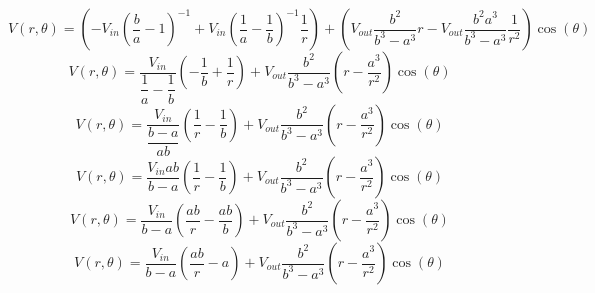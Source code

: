\documentclass[11pt]{article}
\numberwithin{equation}{section}
\begin{document}
$$V(r,\theta) = \left(-V_{in}\left(\frac{b}{a}-1\right)^{-1}+V_{in}\left(\frac{1}{a}-\frac{1}{b}\right)^{-1}\frac{1}{r}\right) + \left(V_{out}\frac{b^{2}}{b^3-a^3}r-V_{out}\frac{b^{2}a^3}{b^3-a^3}\frac{1}{r^{2}}\right)\cos(\theta)$$
$$V(r,\theta) = \frac{V_{in}}{\dfrac{1}{a}-\dfrac{1}{b}}\left(-\frac{1}{b}+\frac{1}{r}\right) + V_{out}\frac{b^{2}}{b^3-a^3}\left(r-\frac{a^3}{r^{2}}\right)\cos(\theta)$$
$$V(r,\theta) = \frac{V_{in}}{\dfrac{b-a}{ab}}\left(\frac{1}{r}-\frac{1}{b}\right) + V_{out}\frac{b^{2}}{b^3-a^3}\left(r-\frac{a^3}{r^{2}}\right)\cos(\theta)$$
$$V(r,\theta) = \frac{V_{in}ab}{b-a}\left(\frac{1}{r}-\frac{1}{b}\right) + V_{out}\frac{b^{2}}{b^3-a^3}\left(r-\frac{a^3}{r^{2}}\right)\cos(\theta)$$
$$V(r,\theta) = \frac{V_{in}}{b-a}\left(\frac{ab}{r}-\frac{ab}{b}\right) + V_{out}\frac{b^{2}}{b^3-a^3}\left(r-\frac{a^3}{r^{2}}\right)\cos(\theta)$$
$$V(r,\theta) = \frac{V_{in}}{b-a}\left(\frac{ab}{r}-a\right) + V_{out}\frac{b^{2}}{b^3-a^3}\left(r-\frac{a^3}{r^{2}}\right)\cos(\theta)$$
\end{document}
